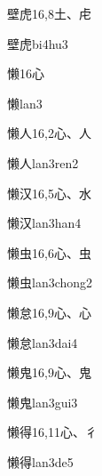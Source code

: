 \begin{entry}{壁虎}{16,8}{⼟、⾌}
  \begin{phonetics}{壁虎}{bi4hu3}
  \end{phonetics}
\end{entry}

\begin{entry}{懒}{16}{⼼}
  \begin{phonetics}{懒}{lan3}
  \end{phonetics}
\end{entry}

\begin{entry}{懒人}{16,2}{⼼、⼈}
  \begin{phonetics}{懒人}{lan3ren2}
  \end{phonetics}
\end{entry}

\begin{entry}{懒汉}{16,5}{⼼、⽔}
  \begin{phonetics}{懒汉}{lan3han4}
  \end{phonetics}
\end{entry}

\begin{entry}{懒虫}{16,6}{⼼、⾍}
  \begin{phonetics}{懒虫}{lan3chong2}
  \end{phonetics}
\end{entry}

\begin{entry}{懒怠}{16,9}{⼼、⼼}
  \begin{phonetics}{懒怠}{lan3dai4}
  \end{phonetics}
\end{entry}

\begin{entry}{懒鬼}{16,9}{⼼、⿁}
  \begin{phonetics}{懒鬼}{lan3gui3}
  \end{phonetics}
\end{entry}

\begin{entry}{懒得}{16,11}{⼼、⼻}
  \begin{phonetics}{懒得}{lan3de5}
  \end{phonetics}
\end{entry}

